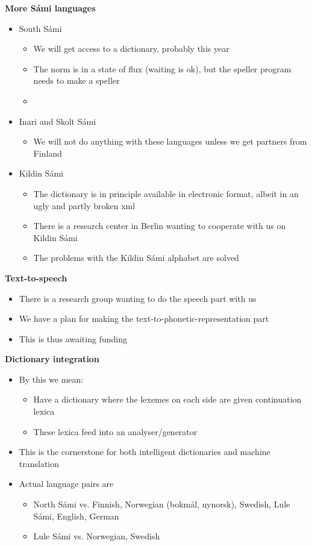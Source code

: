 \documentclass[landscape,english,11pt]{seminar}
\begin{document}
\begin{slide}
\newslide
\textbf{More Sámi languages}
\begin{itemize}
\item South Sámi
\begin{itemize}
\item We will get access to a dictionary, probably this year
\item The norm is in a state of flux (waiting is ok), but the speller program needs to make a speller
\item 
\end{itemize}
\item Inari and Skolt Sámi
\begin{itemize}
\item We will not do anything with these languages unless we get partners from Finland
\end{itemize}
\item Kildin Sámi
\begin{itemize}
\item The dictionary is in principle available in electronic format, albeit in an ugly and partly broken xml
\item There is a research center in Berlin wanting to cooperate with us on Kildin Sámi
\item The problems with the Kildin Sámi alphabet are solved
\end{itemize}
\end{itemize}

\newslide
\textbf{Text-to-speech}
\begin{itemize}
\item There is a research group wanting to do the speech part with us
\item We have a plan for making the text-to-phonetic-representation part
\item This is thus awaiting funding
\end{itemize}

\newslide
\textbf{Dictionary integration}
\begin{itemize}
\item By this we mean:
\begin{itemize}
\item Have a dictionary where the lexemes on each side are given continuation lexica
\item These lexica feed into an analyser/generator
\end{itemize}
\item This is the cornerstone for both intelligent dictionaries and machine translation
\item Actual language pairs are
\begin{itemize}
\item North Sámi vs. Finnish, Norwegian (bokmål, nynorsk), Swedish, Lule Sámi, English, German
\item Lule Sámi vs. Norwegian, Swedish
\end{itemize}


\end{itemize}
\end{slide}
\end{document}
